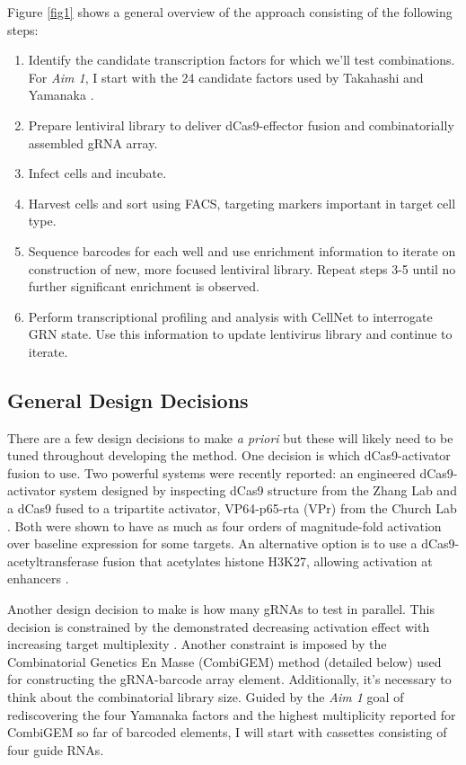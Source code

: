 \documentclass[10pt]{article}
\begin{document}
Figure \ref{fig1} shows a general overview of the approach consisting of the following steps:
\begin{enumerate}
    \setlength{\itemsep}{0pt}
    \item{Identify the candidate transcription factors for which we'll test combinations. For \textit{Aim 1}, I start with the 24 candidate factors used by Takahashi and Yamanaka \cite{takahashi2006induction}.}
    \item{Prepare lentiviral library to deliver dCas9-effector fusion and combinatorially assembled gRNA array.}
    \item{Infect cells and incubate.}
    \item{Harvest cells and sort using FACS, targeting markers important in target cell type.}
    \item{Sequence barcodes for each well and use enrichment information to iterate on construction of new, more focused lentiviral library. Repeat steps 3-5 until no further significant enrichment is observed.}
    \item{Perform transcriptional profiling and analysis with CellNet to interrogate GRN state. Use this information to update lentivirus library and continue to iterate.}
\end{enumerate}

\subsection{General Design Decisions}

There are a few design decisions to make \textit{a priori} but these will likely need to be tuned throughout developing the method. One decision is which dCas9-activator fusion to use. Two powerful systems were recently reported: an engineered dCas9-activator system designed by inspecting dCas9 structure from the Zhang Lab \cite{konermann2014genome} and a dCas9 fused to a tripartite activator, VP64-p65-rta (VPr) from the Church Lab \cite{chavez2015VPR}. Both were shown to have as much as four orders of magnitude-fold activation over baseline expression for some targets. An alternative option is to use a dCas9-acetyltransferase fusion that acetylates histone H3K27, allowing activation at enhancers \cite{hilton2015epigenome}.

Another design decision to make is how many gRNAs to test in parallel. This decision is constrained by the demonstrated decreasing activation effect with increasing target multiplexity \cite{konermann2014genome, chavez2015VPR}. Another constraint is imposed by the Combinatorial Genetics En Masse (CombiGEM) method \cite{cheng2014enhanced} (detailed below) used for constructing the gRNA-barcode array element. Additionally, it's necessary to think about the combinatorial library size. Guided by the \textit{Aim 1} goal of rediscovering the four Yamanaka factors and the highest multiplicity reported for CombiGEM so far of barcoded elements, I will start with cassettes consisting of four guide RNAs.
\end{document}
